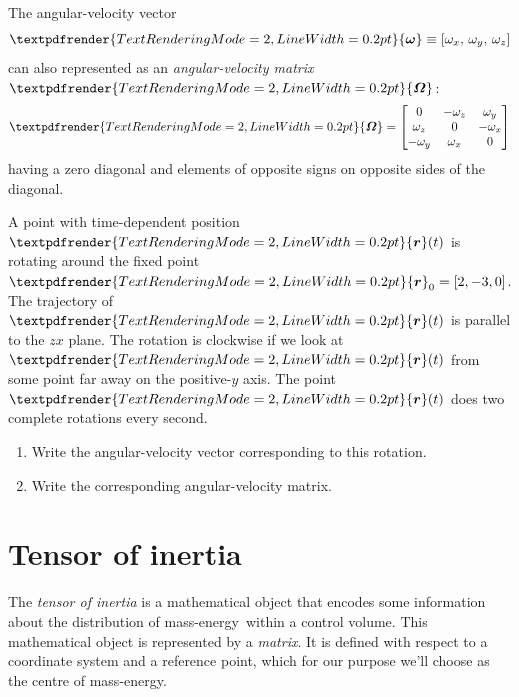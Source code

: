 \documentclass[a4paper,12pt,%
onecolumn,oneside,%
british%
]{memoir}
\renewcommand*{\bm}[1]{\textpdfrender{TextRenderingMode=2,LineWidth=0.2pt}{\boldsymbol{#1}}}
\renewcommand*{\|}[1][]{\nonscript\:#1\vert\nonscript\:\mathopen{}}
\newcommand*{\masse}{mass-energy}
\newcommand*{\yr}{\bm{r}}
\newcommand*{\yOm}{\bm{\varOmega}}
\newcommand*{\yo}{\bm{\omega}}
\newcommand*{\yox}{\omega_{x}}
\newcommand*{\yoy}{\omega_{y}}
\newcommand*{\yoz}{\omega_{z}}
\newcommand*{\yro}{\yr_{0}}
\begin{document}
\medskip

The angular-velocity vector
\begin{equation*}
  \yo \equiv [ \yox,\, \yoy,\, \yoz ]
\end{equation*}
can also represented as an \emph{angular-velocity matrix} $\yOm$:
\begin{equation*}
  \yOm =
  \begin{bmatrix}
    0 & -\yoz & \yoy \\
    \yoz & 0 & -\yox \\
    -\yoy & \yox & 0
  \end{bmatrix}
\end{equation*}
having a zero diagonal and elements of opposite signs on opposite sides of the diagonal.

\begin{exercise}
    A point with time-dependent position $\yr(t)$ is rotating around the fixed point $\yro = [2, -3, 0]$. The trajectory of $\yr(t)$ is parallel to the $zx$ plane. The rotation is clockwise if we look at $\yr(t)$ from some point far away on the positive-$y$ axis. The point $\yr(t)$ does two complete rotations every second.
  \begin{enumerate}[exerc]
  \item Write the angular-velocity vector corresponding to this rotation.
  \item Write the corresponding angular-velocity matrix.
  \end{enumerate}
\end{exercise}



\section{Tensor of inertia}
\label{sec:tensor_inertia}

The \emph{tensor of inertia} is a mathematical object that encodes some information about the distribution of \masse\ within a control volume. This mathematical object is represented by a \emph{matrix}. It is defined with respect to a coordinate system and a reference point, which for our purpose we'll choose as the centre of \masse.
\end{document}
